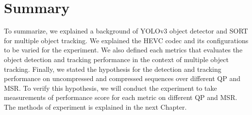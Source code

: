\section{Summary}
\label{sec:background/summary}

To summarize, we explained a background of YOLOv3 object detector and SORT for multiple object tracking. We explained the HEVC codec and its configurations to be varied for the experiment. We also defined each metrics that evaluates the object detection and tracking performance in the context of multiple object tracking. Finally, we stated the hypothesis for the detection and tracking performance on uncompressed and compressed sequences over different QP and MSR. To verify this hypothesis, we will conduct the experiment to take measurements of performance score for each metric on different QP and MSR. The methods of experiment is explained in the next Chapter.
